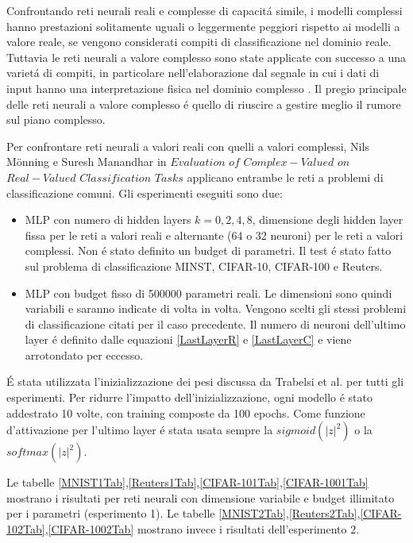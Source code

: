 \documentclass[a4paper,12pt]{report}
\begin{document}
 
 Confrontando reti neurali reali e complesse di capacit\'a simile, i modelli complessi hanno prestazioni solitamente uguali o leggermente peggiori rispetto ai modelli a valore reale, se vengono considerati compiti di classificazione nel dominio reale. 
 Tuttavia le reti neurali a valore complesso sono state applicate con successo a una variet\'a di compiti, in particolare nell'elaborazione dal segnale in cui i dati di input hanno una interpretazione fisica nel dominio complesso\cite{birx1993complex} \cite{sawada2003polar} \cite{yamaki2008singular} \cite{hirose2009complex} \cite{guberman2016complex} \cite{trabelsi2017deep}. Il pregio principale delle 
 reti neurali a valore complesso \'e quello di riuscire a gestire meglio il rumore sul piano complesso.
 
 Per confrontare reti neurali a valori reali con quelli a valori complessi, Nils M\"onning e Suresh Manandhar in $Evaluation$ $of$ $Complex-Valued$ $on$ $Real-Valued$ $Classification$ $Tasks$  \cite{monning2018evaluation} applicano entrambe le reti a problemi di classificazione comuni. 
 Gli esperimenti eseguiti sono due:
 \begin{itemize}
  \item MLP con numero di hidden layers $k = 0, 2, 4, 8$, dimensione degli hidden layer fissa per le reti a valori reali e alternante (64 o 32 neuroni) per le reti a valori complessi. Non \'e stato definito un budget di parametri. Il test \'e stato fatto sul problema di classificazione MINST, CIFAR-10, CIFAR-100 e Reuters. 
  \item MLP con budget fisso di 500000 parametri reali. Le dimensioni sono quindi variabili e saranno indicate di volta in volta. Vengono scelti gli stessi problemi di classificazione citati per il caso precedente. Il numero di neuroni dell'ultimo layer \'e definito dalle equazioni \ref{LastLayerR} e \ref{LastLayerC} e viene arrotondato per eccesso.
 \end{itemize}
 
 \'E stata utilizzata l'inizializzazione dei pesi discussa da Trabelsi et al. \cite{trabelsi2017deep} per tutti gli esperimenti. 
 Per ridurre l'impatto dell'inizializzazione, ogni modello \'e stato addestrato 10 volte, con training composte da 100 epochs. 
 Come funzione d'attivazione per l'ultimo layer \'e stata usata sempre la $sigmoid(|z|^2)$ o la $softmax(|z|^2)$.
  
 Le tabelle \ref{MNIST1Tab},\ref{Reuters1Tab},\ref{CIFAR-101Tab},\ref{CIFAR-1001Tab} mostrano i risultati per reti neurali con dimensione variabile e budget illimitato per i parametri (esperimento 1). 
 Le tabelle \ref{MNIST2Tab},\ref{Reuters2Tab},\ref{CIFAR-102Tab},\ref{CIFAR-1002Tab} mostrano invece i risultati dell'esperimento 2.
 
\end{document}
